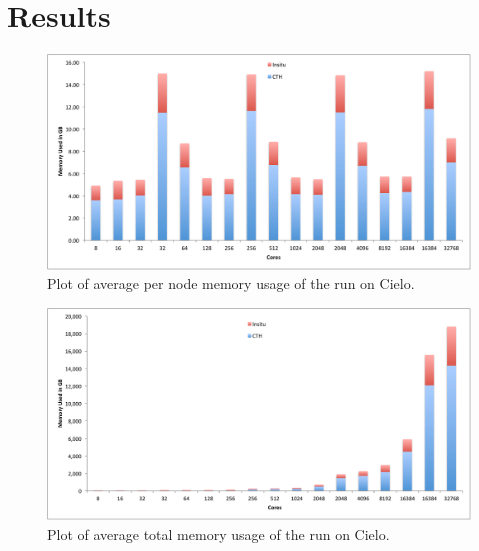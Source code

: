 \section{Results}
\label{sec:Results}


\begin{figure}[htb]
  \centering
  \includegraphics[width=\linewidth]{figures/MemoryUsagePerNode.pdf}
  \caption{Plot of average per node memory usage of the run on Cielo.}
  \label{fig:MemoryPerNode}
\end{figure}

\begin{figure}[htb]
  \centering
  \includegraphics[width=\linewidth]{figures/MemoryUsageTotal.pdf}
  \caption{Plot of average total memory usage of the run on Cielo.}
  \label{fig:MemoryTotal}
\end{figure}
